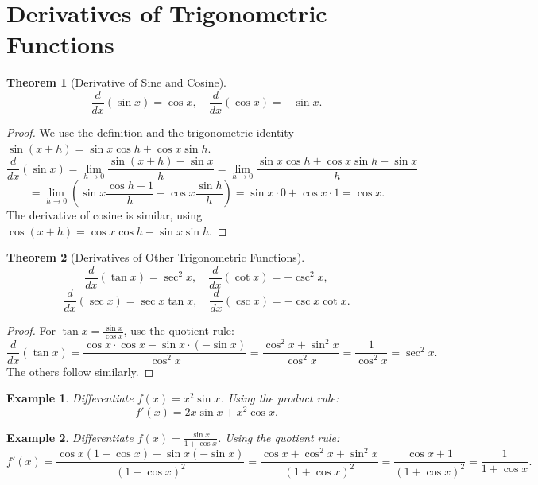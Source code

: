 \documentclass[11pt,a4paper]{article}
\newtheorem{example}{Example}
\newtheorem{theorem}{Theorem}
\begin{document}
\section{Derivatives of Trigonometric Functions}
\begin{theorem}[Derivative of Sine and Cosine]
\[
\frac{d}{dx} (\sin x) = \cos x, \quad \frac{d}{dx} (\cos x) = -\sin x.
\]
\end{theorem}
\begin{proof}
We use the definition and the trigonometric identity $\sin(x+h) = \sin x \cos h + \cos x \sin h$.
\[
\frac{d}{dx} (\sin x) = \lim_{h \to 0} \frac{\sin(x+h) - \sin x}{h} = \lim_{h \to 0} \frac{\sin x \cos h + \cos x \sin h - \sin x}{h}
\]
\[
= \lim_{h \to 0} \left( \sin x \frac{\cos h - 1}{h} + \cos x \frac{\sin h}{h} \right) = \sin x \cdot 0 + \cos x \cdot 1 = \cos x.
\]
The derivative of cosine is similar, using $\cos(x+h) = \cos x \cos h - \sin x \sin h$.
\end{proof}
\begin{theorem}[Derivatives of Other Trigonometric Functions]
\[
\frac{d}{dx} (\tan x) = \sec^2 x, \quad \frac{d}{dx} (\cot x) = -\csc^2 x,
\]
\[
\frac{d}{dx} (\sec x) = \sec x \tan x, \quad \frac{d}{dx} (\csc x) = -\csc x \cot x.
\]
\end{theorem}
\begin{proof}
For $\tan x = \frac{\sin x}{\cos x}$, use the quotient rule:
\[
\frac{d}{dx} (\tan x) = \frac{\cos x \cdot \cos x - \sin x \cdot (-\sin x)}{\cos^2 x} = \frac{\cos^2 x + \sin^2 x}{\cos^2 x} = \frac{1}{\cos^2 x} = \sec^2 x.
\]
The others follow similarly.
\end{proof}
\begin{example}
Differentiate $f(x) = x^2 \sin x$.
Using the product rule:
\[
f'(x) = 2x \sin x + x^2 \cos x.
\]
\end{example}
\begin{example}
Differentiate $f(x) = \frac{\sin x}{1 + \cos x}$.
Using the quotient rule:
\[
f'(x) = \frac{\cos x (1 + \cos x) - \sin x (-\sin x)}{(1 + \cos x)^2} = \frac{\cos x + \cos^2 x + \sin^2 x}{(1 + \cos x)^2} = \frac{\cos x + 1}{(1 + \cos x)^2} = \frac{1}{1 + \cos x}.
\]
\end{example}
\end{document}
